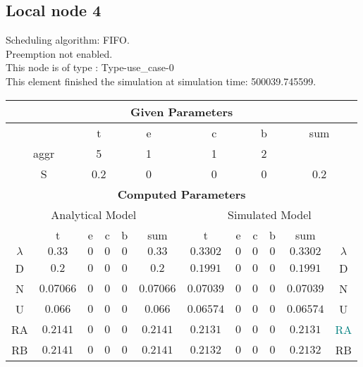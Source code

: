 \documentclass{article}
\begin{document}
\subsection{Local node 4}
Scheduling algorithm: FIFO.\\Preemption not enabled. \\This node is of type : Type-use\_case-0\\
This element finished the simulation at simulation time: 500039.745599.\\
\begin{table}[H]\centering\begin{tabular}{@{}c|cccc|c||cccc|c|c@{}}\toprule\multicolumn{12}{c}{\textbf{Given Parameters}}\\\midrule\multicolumn{2}{c|}{ } & \multicolumn{2}{c}{t} & \multicolumn{2}{c}{e} & \multicolumn{2}{c}{c} & \multicolumn{2}{c}{b} & \multicolumn{2}{|c}{sum} \\\midrule\multicolumn{2}{c|}{aggr} & \multicolumn{2}{c}{5} & \multicolumn{2}{c}{1} & \multicolumn{2}{c}{1} & \multicolumn{2}{c}{2} & \multicolumn{2}{|c}{ } \\ \midrule\multicolumn{2}{c|}{S} & \multicolumn{2}{c}{0.2} & \multicolumn{2}{c}{0} & \multicolumn{2}{c}{0} & \multicolumn{2}{c}{0} & \multicolumn{2}{|c}{0.2}\\ \midrule\midrule\multicolumn{12}{c}{\textbf{Computed Parameters}}\\ \midrule\multicolumn{6}{c||}{Analytical Model} & \multicolumn{6}{c}{Simulated Model}\\ 
 \midrule & t & e & c & b & sum & t & e & c & b & sum &  \\ \midrule$\lambda$ &$0.33$ & $0$ & $0$ & $0$ & $0.33$ & $0.3302$ & $0$ & $0$ & $0$ & $0.3302$& $\lambda$ \\D & $0.2$ & $0$ & $0$ & $0$ & $0.2$ & $0.1991$ & $0$ & $0$ & $0$ & $0.1991$& D\\N & $0.07066$ & $0$ & $0$ & $0$ & $0.07066$ & $0.07039$ & $0$ & $0$ & $0$ & $0.07039$& N\\U & $0.066$ & $0$ & $0$ & $0$ & $0.066$ & $0.06574$ & $0$ & $0$ & $0$ & $0.06574$& U\\RA & $0.2141$ & $0$ & $0$ & $0$ & $0.2141$ & $0.2131$ & $0$ & $0$ & $0$ & $0.2131$& \textcolor{teal}{RA}\\RB & $0.2141$ & $0$ & $0$ & $0$ & $0.2141$ & $0.2132$ & $0$ & $0$ & $0$ & $0.2132$& RB\\
\bottomrule
\end{tabular}
\end{table}
\filbreak
\end{document}
